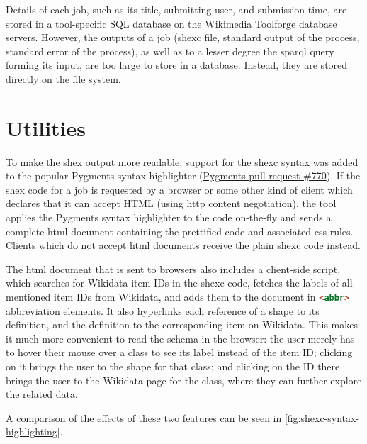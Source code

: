 Details of each \gls{job},
such as its title, submitting user, and submission time,
are stored in a tool-specific SQL database on the \gls{Wikimedia Toolforge} database servers.
However, the outputs of a \gls{job}
(\gls{shexc} file, standard output of the process, standard error of the process),
as well as to a lesser degree the \gls{sparql} query forming its input,
are too large to store in a database.
Instead, they are stored directly on the file system.

\section{Utilities} %
\label{sec:wdsi:utilities}

To make the \gls{shex} output more readable,
support for the \gls{shexc} syntax was added to the popular Pygments syntax highlighter
(\href{https://bitbucket.org/birkenfeld/pygments-main/pull-requests/770}{Pygments pull request \#770}).
If the \gls{shex} code for a \gls{job}
is requested by a browser
or some other kind of client which declares that it can accept HTML
(using \gls{http} content negotiation),
the tool applies the Pygments syntax highlighter to the code on-the-fly
and sends a complete \gls{html} document containing the prettified code and associated \gls{css} rules.
Clients which do not accept \gls{html} documents receive the plain \gls{shexc} code instead.

The \gls{html} document that is sent to browsers
also includes a client-side script,
which searches for \gls{Wikidata} \glspl{item ID} in the \gls{shexc} code,
fetches the \glspl{label} of all mentioned \glspl{item ID} from \gls{Wikidata},
and adds them to the document in \lstinline[language=html]{<abbr>} abbreviation elements.
It also hyperlinks each reference of a \gls{shape} to its definition,
and the definition to the corresponding \gls{item} on \gls{Wikidata}.
This makes it much more convenient to read the \gls{schema} in the browser:
the user merely has to hover their mouse over a class to see its \gls{label} instead of the \gls{item ID};
clicking on it brings the user to the \gls{shape} for that class;
and clicking on the ID there brings the user to the \gls{Wikidata} page for the class,
where they can further explore the related data.

A comparison of the effects of these two features
can be seen in \cref{fig:shexc-syntax-highlighting}.

